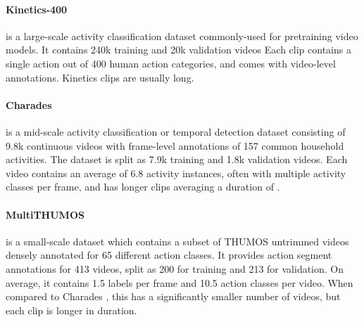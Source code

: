\documentclass[letterpaper]{article} \usepackage{aaai23}  \usepackage{times}  \usepackage{helvet}  \usepackage{courier}  \usepackage[hyphens]{url}  \usepackage{graphicx} \urlstyle{rm} \def\UrlFont{\rm}  \usepackage{natbib}  \usepackage{caption} \frenchspacing  \setlength{\pdfpagewidth}{8.5in}  \setlength{\pdfpageheight}{11in}  \usepackage{algorithm}
\begin{document}
\paragraph{Kinetics-400} \cite{carreira2017quo} is a large-scale activity classification dataset commonly-used for pretraining video models. It contains 240k training and 20k validation videos
Each clip contains a single action out of 400 human action categories, and comes with video-level annotations. Kinetics clips are usually  long.

\paragraph{Charades} \cite{sigurdsson2016hollywood} is a mid-scale activity classification or temporal detection dataset consisting of 9.8k continuous videos with frame-level annotations of 157 common household activities. The dataset is split as 7.9k training and 1.8k validation videos. Each video contains an average of 6.8 activity instances, often with multiple activity classes per frame, and has longer clips averaging a duration of .

\paragraph{MultiTHUMOS} \cite{yeung2018every} is a small-scale dataset which contains a subset of THUMOS \cite{jiang2014thumos} untrimmed videos densely annotated for 65 different action classes. It provides action segment annotations for 413 videos, split as 200 for training and 213 for validation. On average, it contains 1.5 labels per frame and 10.5 action classes per video. When compared to Charades \cite{sigurdsson2016hollywood}, this has a significantly smaller number of videos, but each clip is longer in duration.


\end{document}
